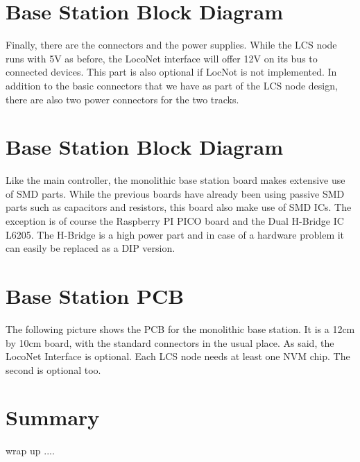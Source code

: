 
\section{Base Station Block Diagram}
Finally, there are the connectors and the power supplies. While the LCS node runs with 5V as before, the LocoNet interface will offer 12V on its bus to connected devices. This part is also optional if LocNot is not implemented. In addition to the basic connectors that we have as part of the LCS node design, there are also two power connectors for the two tracks.


\section{Base Station Block Diagram}
Like the main controller, the monolithic base station board makes extensive use of SMD parts. While the previous boards have already been using passive SMD parts such as capacitors and resistors, this board also make use of SMD ICs. The exception is of course the Raspberry PI PICO board and the Dual H-Bridge IC L6205. The H-Bridge is a high power part and in case of a hardware problem it can easily be replaced as a DIP version.

\section{Base Station PCB}

The following picture shows the PCB for the monolithic base station. It is a 12cm by 10cm board, with the standard connectors in the usual place. As said, the LocoNet Interface is optional. Each LCS node needs at least one NVM chip. The second is optional too.


\section{Summary}

wrap up ....


